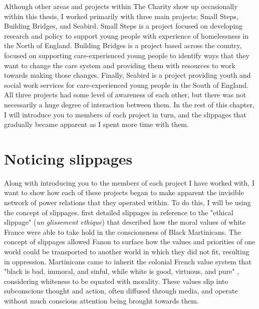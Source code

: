 Although other areas and projects within The Charity show up occasionally within this thesis, I  worked primarily with three main projects: Small Steps, Building Bridges, and Seabird. Small Steps is a project focused on developing research and policy to support young people with experience of homelessness in the North of England. Building Bridges is a project based across the country, focused on supporting care-experienced young people to identify ways that they want to change the care system and providing them with resources to work towards making those changes. Finally, Seabird is a project providing youth and social work services for care-experienced young people in the South of England. All three projects had some level of awareness of each other, but there was not necessarily a huge degree of interaction between them. In the rest of this chapter, I will introduce you to members of each project in turn, and the slippages that gradually became apparent as I spent more time with them. 

\section{Noticing slippages}

Along with introducing you to the members of each project I have worked with, I want to show how each of these projects began to make apparent the invisible network of power relations that they operated within. To do this, I will be using the concept of slippages. \citet{fanon_black_1986} first detailed slippages in reference to the "ethical slippage" (\textit{un glissement ethique}) that described how the moral values of white France were able to take hold in the consciousness of Black Martinicans. The concept of slippages allowed Fanon to surface how the values and priorities of one world could be transported to another world in which they did not fit, resulting in oppression. Martinicans came to inherit the colonial French value system that "black is bad, immoral, and sinful, while white is good, virtuous, and pure" \citep[p. 11]{sullivan_ethical_2004}, considering whiteness to be equated with morality. These values slip into subconscious thought and action, often diffused through media, and operate without much conscious attention being brought towards them. 


